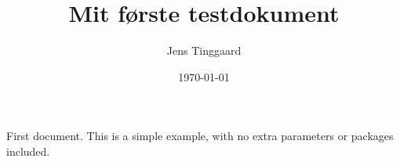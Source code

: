 \documentclass[12pt]{article}
\title{Mit første testdokument}
\author{Jens Tinggaard}
\date{\today}
\begin{document}
First document. This is a simple example, with no
extra parameters or packages included.
\end{document}
